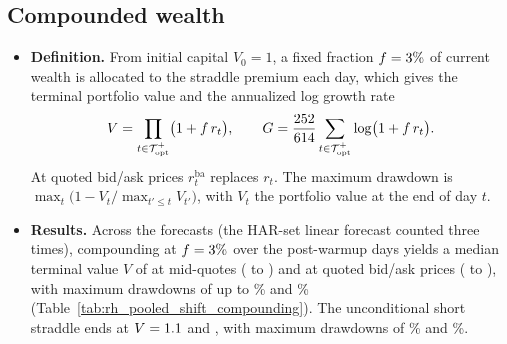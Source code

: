 \subsection{Compounded wealth}
\label{app:rh_econ_compounding}
\begin{itemize}
\item \textbf{Definition.} From initial capital $V_0 = 1$, a fixed fraction $f = 3\%$ of current wealth
  is allocated to the straddle premium each day, which gives the terminal portfolio value and the annualized log
  growth rate
  \[
  V = \prod_{t \in \mathcal T_{\mathrm{opt}}^{+}}\bigl(1 + f\,r_t\bigr),
  \qquad
  G = \frac{252}{614}\sum_{t \in \mathcal T_{\mathrm{opt}}^{+}}\log\bigl(1 + f\,r_t\bigr).
  \]
  At quoted bid/ask prices $r^{\mathrm{ba}}_t$ replaces $r_t$. The maximum drawdown is
  $\max_t\bigl(1 - V_t/\max_{t'\le t}V_{t'}\bigr)$, with $V_t$ the portfolio value at the end of day $t$.
\item \textbf{Results.} Across the \rhpsNfc{} forecasts (the HAR-set linear forecast counted three times),
  compounding at $f = 3\%$ over the \rhpcNdays{} post-warmup days yields a median terminal value $V$ of
  \rhpcWMedMid{} at mid-quotes (\rhpcWLoMid{} to \rhpcWHiMid) and \rhpcWMedX{} at quoted bid/ask prices (\rhpcWLoX{}
  to \rhpcWHiX), with maximum drawdowns of up to \rhpcDDMaxMid\% and \rhpcDDMaxX\%
  (Table~\ref{tab:rh_pooled_shift_compounding}). The unconditional short straddle ends at $V = 1.1$ and
  \rhpcAWX, with maximum drawdowns of \rhpcADDMid\% and \rhpcADDX\%.
\end{itemize}

